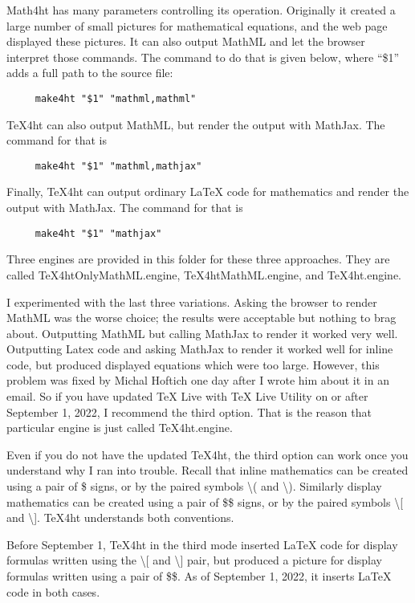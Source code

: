 \documentclass[11pt, oneside]{article}   	%
\begin{document}
Math4ht has many parameters controlling its operation. Originally it created a large number of small pictures for  mathematical equations, and the web page displayed these pictures. It can also output MathML and let the browser interpret those commands. The command to do that is given below, where ``\$1'' adds a full path to the source file:
\begin{verbatim}
     make4ht "$1" "mathml,mathml"
\end{verbatim}
TeX4ht can also output MathML, but render the output with MathJax. The command for that is
\begin{verbatim}
     make4ht "$1" "mathml,mathjax"
\end{verbatim}
Finally, TeX4ht can output ordinary LaTeX code for mathematics and render the output with MathJax. The command for that is
\begin{verbatim}
     make4ht "$1" "mathjax"
\end{verbatim}
Three engines are provided in this folder for these three approaches. They are called TeX4htOnlyMathML.engine,
TeX4htMathML.engine, and TeX4ht.engine. 


I experimented with the last three variations.
Asking the browser to render MathML was the worse choice; the results were acceptable but nothing to brag about. Outputting MathML but calling MathJax to render it worked very well. Outputting Latex code and asking MathJax to render it worked well for inline code, but produced displayed equations which were too large.
However, this problem was fixed by Michal Hoftich one day after I wrote him about it in an email. So if you have updated TeX Live with TeX Live Utility on or after September 1, 2022, I recommend the third option. That is the reason that particular engine is just called TeX4ht.engine.

Even if you do not have the updated TeX4ht, the third option can work once you understand why I ran into trouble. Recall that inline mathematics can be created using a pair of \$ signs, or by the paired symbols \textbackslash ( and \textbackslash ). 
Similarly display mathematics can be created using a pair of \$\$ signs, or by the paired symbols  \textbackslash [ and \textbackslash ]. TeX4ht  understands both conventions. 

Before September 1, TeX4ht in the third mode  inserted LaTeX code for display formulas written using the \textbackslash [ and \textbackslash ] pair, but produced a picture for display formulas written using a pair of \$\$. As of September 1, 2022, it inserts LaTeX code in both cases.
\end{document}
